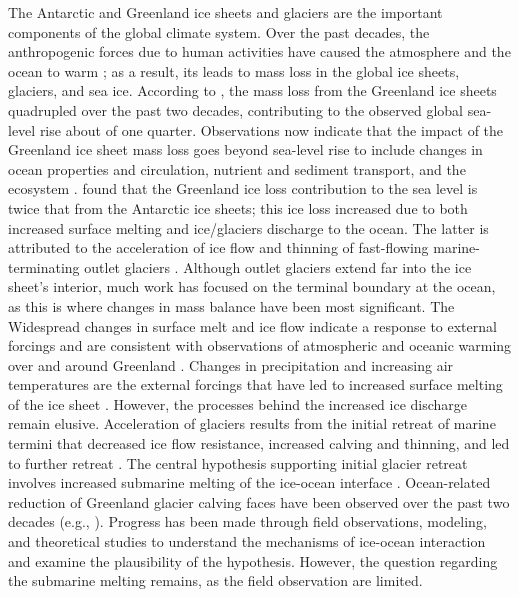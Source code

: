 \documentclass[11pt,a4paper]{article}
\begin{document}
	The Antarctic and Greenland ice sheets and glaciers are the important components of the global climate system. Over the past decades, the anthropogenic forces due to human activities have caused the atmosphere and the ocean to warm \citep{noble2020sensitivity}; as a result, its leads to mass loss in the global ice sheets, glaciers, and sea ice. According to \cite{straneo2013north}, the mass loss from the Greenland ice sheets quadrupled over the past two decades, contributing to the observed global sea-level rise about of one quarter. Observations now indicate that the impact of the Greenland ice sheet mass loss goes beyond sea-level rise to include changes in ocean properties and circulation, nutrient and sediment transport, and the ecosystem \citep{catania2020future}. \cite{straneo2013north} found that the Greenland ice loss contribution to the sea level is twice that from the Antarctic ice sheets; this ice loss increased due to both increased surface melting and ice/glaciers discharge to the ocean. %
	The latter is attributed to the acceleration of ice flow and thinning of fast-flowing marine-terminating outlet glaciers \citep{nick2013future}. Although outlet glaciers extend far into the ice sheet's interior, much work has focused on the terminal boundary at the ocean, as this is where changes in mass balance have been most significant. The Widespread changes in surface melt and ice flow indicate a response to external forcings and are consistent with observations of atmospheric and oceanic warming over and around Greenland \citep{bersch2007recent,box2009greenland,straneo2013north}. Changes in precipitation and increasing air temperatures are the external forcings that have led to increased surface melting of the ice sheet \citep{van2009partitioning,straneo2013north}. However, the processes behind the increased ice discharge remain elusive. %
	Acceleration of glaciers results from the initial retreat of marine termini that decreased ice flow resistance, increased calving and thinning, and led to further retreat \citep{nick2009large,straneo2013challenges}. The central hypothesis supporting initial glacier retreat involves increased submarine melting of the ice-ocean interface \citep{straneo2013challenges}. Ocean-related reduction of Greenland glacier calving faces have been observed over the past two decades (e.g., \cite{rignot2010rapid,straneo2015dynamics,schaffer2017warm}). Progress has been made through field observations, modeling, and theoretical studies to understand the mechanisms of ice-ocean interaction and examine the plausibility of the hypothesis. However, the question regarding the submarine melting remains, as the field observation are limited.
	
\end{document}
